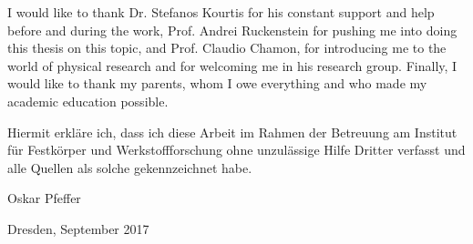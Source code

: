\clearpage



I would like to thank Dr. Stefanos Kourtis for his constant support and help before and during the work, Prof. Andrei Ruckenstein for pushing me into doing this thesis on this topic, and Prof. Claudio Chamon, for introducing me to the world of physical research and for welcoming me in his research group.
Finally, I would like to thank my parents, whom I owe everything and who made my academic education possible.
\clearpage
\thispagestyle{empty}
\vspace*{1.5em}

Hiermit erkläre ich, dass ich diese Arbeit im Rahmen der Betreuung am Institut
für Festkörper und Werkstoffforschung ohne unzulässige Hilfe Dritter verfasst und alle Quellen als solche gekennzeichnet habe.

\vspace*{45em}

Oskar Pfeffer \par
Dresden, September 2017

